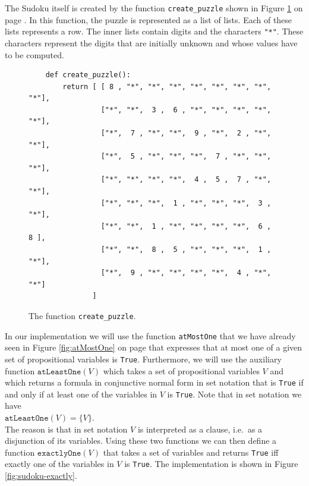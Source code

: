The Sudoku itself is created by the function \texttt{create\_puzzle} shown in Figure
\ref{fig:sudoku-create-puzzle} on page \pageref{fig:sudoku-create-puzzle}.  In this function, the puzzle is
represented as a list of lists.  Each of these lists represents a row.  The inner lists contain digits and the
characters \texttt{"*"}.  These characters represent the digits that are initially unknown and whose values have
to be computed.

\begin{figure}[!ht]
\centering
\begin{verbatim}
    def create_puzzle():
        return [ [ 8 , "*", "*", "*", "*", "*", "*", "*", "*"], 
                 ["*", "*",  3 ,  6 , "*", "*", "*", "*", "*"],
                 ["*",  7 , "*", "*",  9 , "*",  2 , "*", "*"],
                 ["*",  5 , "*", "*", "*",  7 , "*", "*", "*"],
                 ["*", "*", "*", "*",  4 ,  5 ,  7 , "*", "*"],
                 ["*", "*", "*",  1 , "*", "*", "*",  3 , "*"],
                 ["*", "*",  1 , "*", "*", "*", "*",  6 ,  8 ],
                 ["*", "*",  8 ,  5 , "*", "*", "*",  1 , "*"],
                 ["*",  9 , "*", "*", "*", "*",  4 , "*", "*"]
               ]
\end{verbatim}
\vspace*{-0.3cm}
\caption{The function \texttt{create\_puzzle}.}
\label{fig:sudoku-create-puzzle}
\end{figure}

In our implementation we will use the function \texttt{atMostOne} that we have already seen in Figure
\ref{fig:atMostOne} on page \pageref{fig:atMostOne} that expresses that at most one of a given set of
propositional variables is \texttt{True}.  Furthermore, we will use the auxiliary function
$\texttt{atLeastOne}(V)$ which takes a set of propositional variables $V$ and which returns a formula in
conjunctive normal form in set notation that is \texttt{True} if and only if at least one of the variables in
$V$ is \texttt{True}.  Note that in set notation we have
\\[0.2cm]
\hspace*{1.3cm}
$\texttt{atLeastOne}(V) = \bigl\{ V \bigr\}$.
\\[0.2cm]
The reason is that in set notation  $V$ is interpreted as a clause, i.e.~as a disjunction of its variables.
Using these two functions we can then define a function $\texttt{exactlyOne}(V)$ that
takes a set of variables and returns \texttt{True} iff exactly one of the variables in $V$ is \texttt{True}.
The implementation is shown in Figure \ref{fig:sudoku-exactly}.

